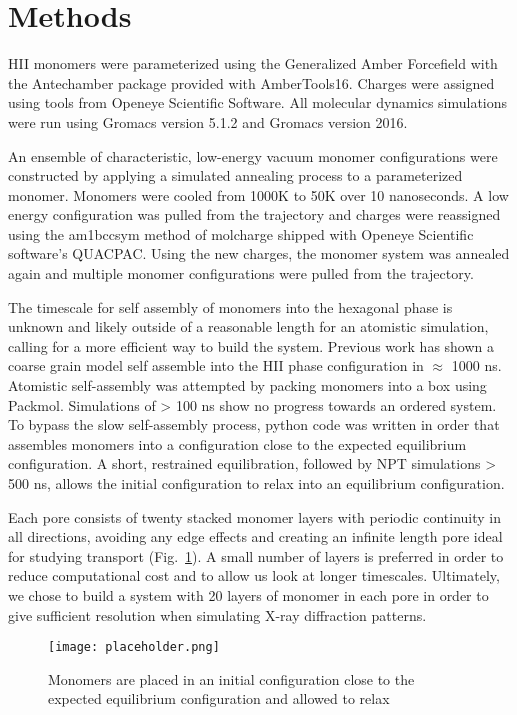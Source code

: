 \section{Methods}
	
HII monomers were parameterized using the Generalized Amber Forcefield
with the Antechamber package provided with AmberTools16. Charges were
assigned using tools from Openeye Scientific Software. All molecular dynamics
simulations were run using Gromacs version 5.1.2 and Gromacs version 2016.
	
An ensemble of characteristic, low-energy vacuum monomer configurations
were constructed by applying a simulated annealing process to a
parameterized monomer. Monomers were cooled from 1000K to 50K over 10
nanoseconds. A low energy configuration was pulled from the trajectory 
and charges were reassigned using the am1bccsym method of molcharge
shipped with Openeye Scientific software's QUACPAC. Using the new
charges, the monomer system was annealed again and multiple monomer
configurations were pulled from the trajectory.
	
The timescale for self assembly of monomers into the hexagonal phase is
unknown and likely outside of a reasonable length for an atomistic
simulation, calling for a more efficient way to build the system. 
Previous work has shown a coarse grain model self assemble into the HII
phase configuration in $\approx$ 1000 ns. Atomistic self-assembly was 
attempted by packing monomers into a box using Packmol. Simulations of >
100 ns show no progress towards an ordered system. To bypass the 
slow self-assembly process, python code was written in order that 
assembles monomers into a configuration close to the expected 
equilibrium configuration. A short, restrained equilibration, followed 
by NPT simulations > 500 ns, allows the initial configuration to relax
into an equilibrium configuration.

Each pore consists of twenty stacked monomer layers with periodic 
continuity in all directions, avoiding any edge effects and creating an
infinite length pore ideal for studying transport
(Fig.~\ref{fig:initial}). A small number of layers is preferred in order
to reduce computational cost and to allow us look at longer timescales.
Ultimately, we chose to build a system with 20 layers of monomer in each
pore in order to give sufficient resolution when simulating X-ray 
diffraction patterns.

\begin{figure}
\texttt{[image: placeholder.png]}
	\caption{Monomers are placed in an initial configuration close to
	         the expected equilibrium configuration and allowed to relax}
	\label{fig:initial}
\end{figure}

